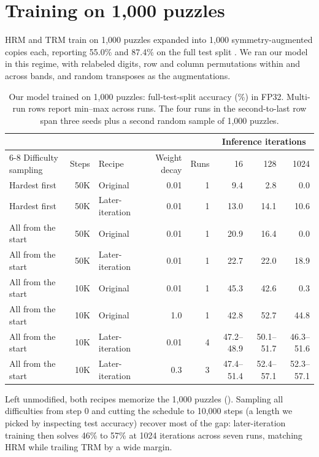 \section{Training on 1,000 puzzles}
\label{app:small}

HRM and TRM train on 1,000 puzzles expanded into 1,000 symmetry-augmented copies each, reporting 55.0\% and 87.4\% on the full test split \citep{wang2025hierarchical,jolicoeur2025less}. We ran our model in this regime, with relabeled digits, row and column permutations within and across bands, and random transposes as the augmentations.

\begin{table}[h]
\centering
\small
\caption{Our model trained on 1,000 puzzles: full-test-split accuracy (\%) in FP32. Multi-run rows report min--max across runs. The four runs in the second-to-last row span three seeds plus a second random sample of 1,000 puzzles.}
\label{tab:small}
\begin{tabular}{@{}lrlrrrrr@{}}
\toprule
 & & & & & \multicolumn{3}{c}{Inference iterations} \\
\cmidrule(l){6-8}
Difficulty sampling & Steps & Recipe & Weight decay & Runs & 16 & 128 & 1024 \\
\midrule
Hardest first & 50K & Original & 0.01 & 1 & 9.4 & 2.8 & 0.0 \\
Hardest first & 50K & Later-iteration & 0.01 & 1 & 13.0 & 14.1 & 10.6 \\
All from the start & 50K & Original & 0.01 & 1 & 20.9 & 16.4 & 0.0 \\
All from the start & 50K & Later-iteration & 0.01 & 1 & 22.7 & 22.0 & 18.9 \\
\midrule
All from the start & 10K & Original & 0.01 & 1 & 45.3 & 42.6 & 0.3 \\
All from the start & 10K & Original & 1.0 & 1 & 42.8 & 52.7 & 44.8 \\
All from the start & 10K & Later-iteration & 0.01 & 4 & 47.2--48.9 & 50.1--51.7 & 46.3--51.6 \\
All from the start & 10K & Later-iteration & 0.3 & 3 & 47.4--51.4 & 52.4--57.1 & 52.3--57.1 \\
\bottomrule
\end{tabular}
\end{table}

Left unmodified, both recipes memorize the 1,000 puzzles (). Sampling all difficulties from step 0 and cutting the schedule to 10,000 steps (a length we picked by inspecting test accuracy) recover most of the gap: later-iteration training then solves 46\% to 57\% at 1024 iterations across seven runs, matching HRM while trailing TRM by a wide margin.

